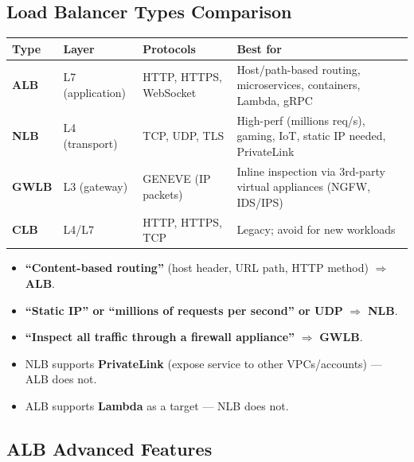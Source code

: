 \subsection{Load Balancer Types Comparison}

\begin{comparebox}[title={ELB type selection}]
\begin{tabular}{@{}p{1.8cm}p{2.5cm}p{3cm}p{4cm}@{}}
\toprule
\textbf{Type} & \textbf{Layer} & \textbf{Protocols} & \textbf{Best for} \\
\midrule
\textbf{ALB}  & L7 (application) & HTTP, HTTPS, WebSocket &
  Host/path-based routing, microservices, containers, Lambda, gRPC \\[4pt]
\textbf{NLB}  & L4 (transport) & TCP, UDP, TLS &
  High-perf (millions req/s), gaming, IoT, static IP needed, PrivateLink \\[4pt]
\textbf{GWLB} & L3 (gateway) & GENEVE (IP packets) &
  Inline inspection via 3rd-party virtual appliances (NGFW, IDS/IPS) \\[4pt]
\textbf{CLB}  & L4/L7 & HTTP, HTTPS, TCP &
  Legacy; avoid for new workloads \\
\bottomrule
\end{tabular}
\end{comparebox}

\begin{examtip}
\begin{itemize}
  \item \textbf{``Content-based routing''} (host header, URL path, HTTP method) $\Rightarrow$ \textbf{ALB}.
  \item \textbf{``Static IP'' or ``millions of requests per second'' or UDP} $\Rightarrow$ \textbf{NLB}.
  \item \textbf{``Inspect all traffic through a firewall appliance''} $\Rightarrow$ \textbf{GWLB}.
  \item NLB supports \textbf{PrivateLink} (expose service to other VPCs/accounts) --- ALB does not.
  \item ALB supports \textbf{Lambda} as a target --- NLB does not.
\end{itemize}
\end{examtip}

\subsection{ALB Advanced Features}


